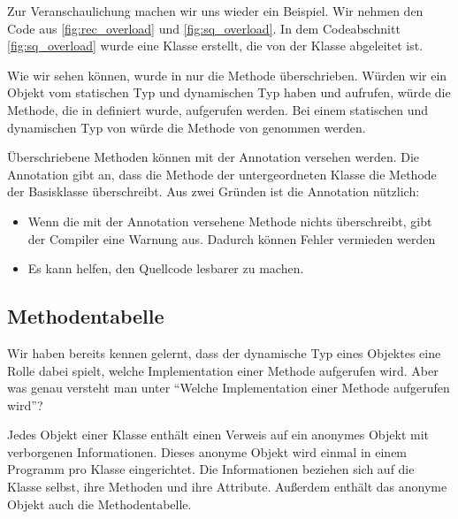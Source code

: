 \documentclass{tuda-pub}
\begin{document}
  Zur Veranschaulichung machen wir uns wieder ein Beispiel. Wir nehmen den Code aus
  \ref{fig:rec_overload} und \ref{fig:sq_overload}. In dem Codeabschnitt \ref{fig:sq_overload}
  wurde eine Klasse  erstellt, die von der Klasse 
  abgeleitet ist.
  \br

  Wie wir sehen können, wurde in  nur die Methode
   überschrieben. Würden wir ein Objekt vom statischen Typ
   und dynamischen Typ  haben und
   aufrufen, würde die Methode, die in  definiert
  wurde, aufgerufen werden. Bei einem statischen und dynamischen Typ von 
  würde die Methode  von  genommen werden.

  \br

  Überschriebene Methoden können mit der Annotation  versehen werden. Die
  Annotation  gibt an, dass die Methode der untergeordneten Klasse die
  Methode der Basisklasse überschreibt. Aus zwei Gründen ist die Annotation
   nützlich:

  \begin{itemize}
    \item Wenn die mit der Annotation versehene Methode nichts überschreibt, gibt der Compiler
    eine Warnung aus. Dadurch können Fehler vermieden werden
    \item Es kann helfen, den Quellcode lesbarer zu machen.
  \end{itemize}

  \clearpage

  \subsection{Methodentabelle}
  Wir haben bereits kennen gelernt, dass der dynamische Typ eines Objektes eine Rolle dabei
  spielt, welche Implementation einer Methode aufgerufen wird. Aber was genau versteht man unter
  \enquote{Welche Implementation einer Methode aufgerufen wird}?

  \br

  Jedes Objekt einer Klasse enthält einen Verweis auf ein anonymes Objekt mit verborgenen
  Informationen. Dieses anonyme Objekt wird einmal in einem Programm pro Klasse eingerichtet. Die
  Informationen beziehen sich auf die Klasse selbst, ihre Methoden und ihre Attribute. Außerdem
  enthält das anonyme Objekt auch die Methodentabelle.
\end{document}
